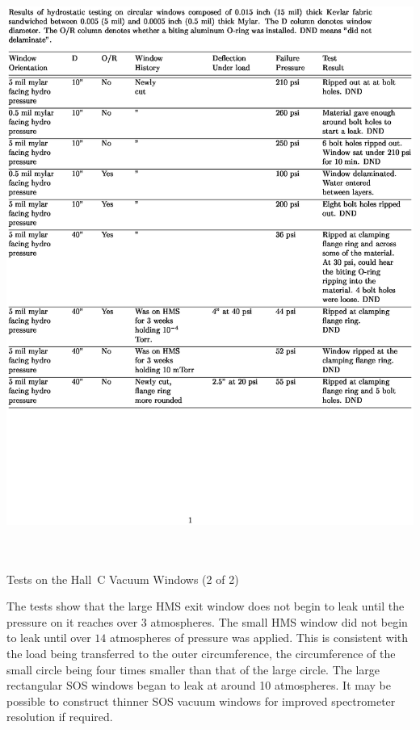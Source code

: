 \begin{table}
\includegraphics[height=7.5in]{spectrometers/vacuumc.ps}
\caption{Tests on the Hall~C Vacuum Windows (2 of 2) \label{tab:win_tst2}}
\end{table}
\clearpage

The tests show that the large HMS exit window does not begin to leak until
the pressure on it reaches over $3$ atmospheres. The small HMS window
did not begin to leak until over $14$ atmospheres of pressure was applied.
This is consistent with the load being transferred to
the outer circumference, the circumference of the small circle being four
times smaller than that of the large circle. The large rectangular SOS windows
began to leak at around 10 atmospheres. It may be possible to construct thinner
SOS vacuum windows for improved spectrometer resolution if required.


